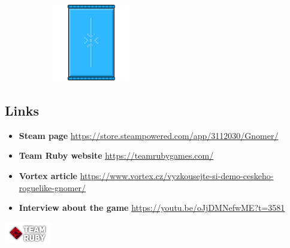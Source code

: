\documentclass[a4paper,10pt,english]{article}
\begin{document}
\begin{figure}[h]
\begin{subfigure}{0.29\linewidth}
\label{Fig:Style1B}
\end{subfigure}\hfill
%
\begin{subfigure}{0.29\linewidth}
\includegraphics[width=\linewidth]{pack.png}
\label{Fig:Style1C}
\end{subfigure}

\end{figure}

\subsection*{Links}
\begin{itemize}
    \item[] \textbf{Steam page} \href{https://store.steampowered.com/app/3112030/Gnomer/}{https://store.steampowered.com/app/3112030/Gnomer/}
    \item[] \textbf{Team Ruby website} \href{https://teamrubygames.com/}{https://teamrubygames.com/}
    \item[] \textbf{Vortex article} \href{https://www.vortex.cz/vyzkousejte-si-demo-ceskeho-roguelike-gnomer/}{https://www.vortex.cz/vyzkousejte-si-demo-ceskeho-roguelike-gnomer/}
    \item[] \textbf{Interview about the game} \href{https://youtu.be/oJjDMNefwME?t=3581}{https://youtu.be/oJjDMNefwME?t=3581}
    
\end{itemize}


\begin{center}
    \includegraphics[width=0.15\textwidth]{RubyLogo.png}
\end{center}
\end{document}
